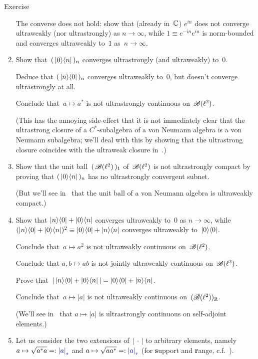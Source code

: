 \documentclass[a]{subfiles}
\begin{document}
\begin{parsec}
\begin{point}[vn-counterexamples]{Exercise}
\begin{enumerate}
The converse does not hold:
show that (already in~$\mathbb{C}$)
$e^{in}$
does not converge ultraweakly 
(nor ultrastrongly) as $n\to \infty$,
while $1\equiv e^{-in} e^{in}$
is norm-bounded and
converges ultraweakly to~$1$ as~$n\to\infty$.
\item
\label{vn-counterexamples-4}
Show that~$(\,\left|0\right>\!\left<n\right|\,)_n$ converges ultrastrongly 
(and ultraweakly) to~$0$.

Deduce that $(\,\left|n\right>\!\left<0\right|\,)_n$ converges ultraweakly to~$0$,
but doesn't converge ultrastrongly at all.

Conclude that~$a\mapsto a^*$ is not ultrastrongly continuous 
on~$\mathscr{B}(\ell^2)$.

(This has the annoying side-effect
that it is not immediately clear that the ultrastrong
closure of a $C^*$-subalgebra of a von Neumann algebra 
is a von Neumann subalgebra; we'll deal with this
by showing that the ultrastrong closure coincides
with the ultraweak closure in~.)
\item
Show that the unit ball~$(\,\mathscr{B}(\ell^2)\,)_1$
of~$\mathscr{B}(\ell^2)$ is not ultrastrongly compact
by proving that $(\,\left|0\right>\!\left<n\right|\,)_n$
has no ultrastrongly convergent subnet.

(But we'll see in~ that
the unit ball of a von Neumann algebra
is ultraweakly compact.)

\item
\label{vn-counterexamples-6}
Show that $\left|n\right>\!\left<0\right|+\left|0\right>\!\left<n\right|$
converges ultraweakly to~$0$ as $n\to \infty$,
while $(\left|n\right>\!\left<0\right|+\left|0\right>\!\left<n\right|)^2\equiv \left|0\right>\!\left<0\right|+\left|n\right>\!\left<n\right|$
converges ultraweakly to~$\left|0\right>\!\left<0\right|$.

Conclude that~$a\mapsto a^2$ is not ultraweakly continuous on~$\mathscr{B}(\ell^2)$.

Conclude that $a,b\mapsto ab$ is not jointly ultraweakly continuous
on~$\mathscr{B}(\ell^2)$.

Prove that~$\left|\, \left|n\right>\!\left<0\right|+\left|0\right>\!\left<n\right|\,\right|
= \left|0\right>\!\left<0\right|+\left|n\right>\!\left<n\right|$.

Conclude that~$a\mapsto \left|a\right|$
is not ultraweakly continuous on~$(\mathscr{B}(\ell^2))_{\mathbb{R}}$.

(We'll see in~ that $a\mapsto \left|a\right|$
is ultrastrongly continuous on self-adjoint elements.)

\item
Let us consider the two extensions of~$\left|\,\cdot\,\right|$
to arbitrary elements, namely
$a\mapsto \sqrt{a^*a}=:\Define{\left|a\right|_s}$ and 
$a\mapsto \sqrt{aa^*}=:\Define{\left|a\right|_r}$
(for \textbf{s}upport and \textbf{r}ange,
c.f.~).


\end{enumerate}
\end{point}
\end{parsec}
\end{document}
